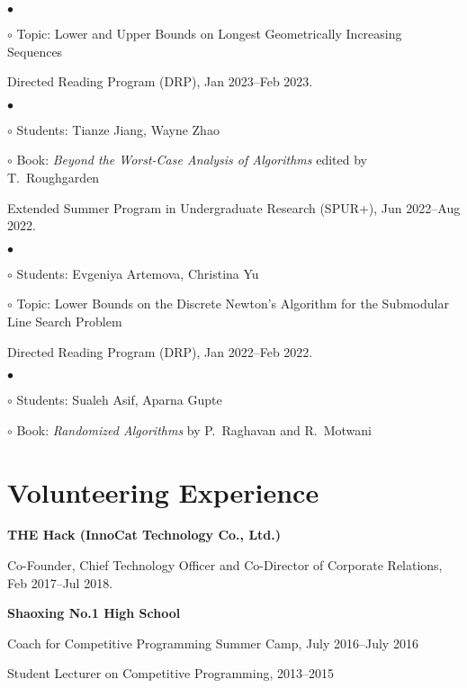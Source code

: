 \documentclass[margin,line]{res}
\newenvironment{list1}{
  \begin{list}{\ding{113}}{%
      \setlength{\itemsep}{0in}
      \setlength{\parsep}{0.025in} \setlength{\parskip}{0in}
      \setlength{\topsep}{0in} \setlength{\partopsep}{0in}
      \setlength{\leftmargin}{0.17in}}}{\end{list}}
\newenvironment{list2}{
  \begin{list}{$\bullet$}{%
      \setlength{\itemsep}{0in}
      \setlength{\parsep}{0in} \setlength{\parskip}{0in}
      \setlength{\topsep}{0in} \setlength{\partopsep}{0in}
      \setlength{\leftmargin}{0.2in}}}{\end{list}}
\newenvironment{list3}{
  \begin{list}{\ding{113}}{%
      \setlength{\itemsep}{0.05in}
      \setlength{\parsep}{0.025in} \setlength{\parskip}{0in}
      \setlength{\topsep}{0in} \setlength{\partopsep}{0in}
      \setlength{\leftmargin}{0.17in}}}{\end{list}}
\begin{document}
\begin{resume}
\begin{list3}
\begin{list2}
  \item[$\circ$] Topic: Lower and Upper Bounds on Longest Geometrically Increasing Sequences
  \end{list2}
\item[] Directed Reading Program (DRP), Jan 2023--Feb 2023.
  \begin{list2}
  \item[$\circ$] Students: Tianze Jiang, Wayne Zhao
  \item[$\circ$] Book: \emph{Beyond the Worst-Case Analysis of Algorithms} edited by T.\ Roughgarden
  \end{list2}
\item[] Extended Summer Program in Undergraduate Research (SPUR+), Jun 2022--Aug 2022.
  \begin{list2}
  \item[$\circ$] Students: Evgeniya Artemova, Christina Yu
  \item[$\circ$] Topic: Lower Bounds on the Discrete Newton's Algorithm for the Submodular Line Search Problem
  \end{list2}
\item[] Directed Reading Program (DRP), Jan 2022--Feb 2022.
  \begin{list2}
  \item[$\circ$] Students: Sualeh Asif, Aparna Gupte
  \item[$\circ$] Book: \emph{Randomized Algorithms} by P.\ Raghavan and R.\ Motwani
  \end{list2}
\end{list3}

\section{\sc Volunteering Experience}

{\bf THE Hack (InnoCat Technology Co., Ltd.)}\\
\vspace*{-.1in}
\begin{list1}
\item[] Co-Founder, Chief Technology Officer and Co-Director of Corporate Relations, Feb 2017--Jul 2018.
\end{list1}

{\bf Shaoxing No.1 High School}\\
\vspace*{-.1in}
\begin{list1}
\item[] Coach for Competitive Programming Summer Camp, July 2016--July 2016
\item[] Student Lecturer on Competitive Programming, 2013--2015
\end{list1}



\end{resume}
\end{document}
